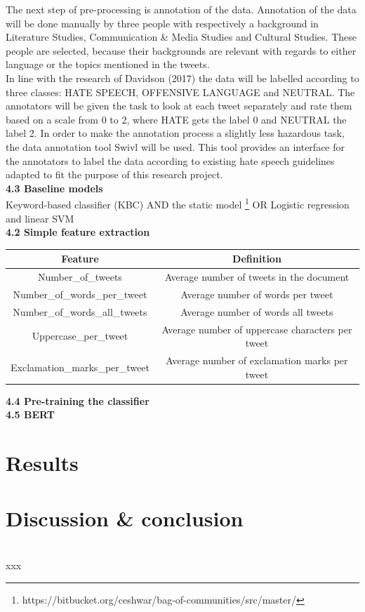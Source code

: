 \documentclass[a4paper,pdf]{article}
\begin{document}
\break{}
The next step of pre-processing is annotation of the data. Annotation of the data will be done manually by three people with respectively a background in Literature Studies, Communication \& Media Studies and Cultural Studies. These people are selected, because their backgrounds are relevant with regards to either language or the topics mentioned in the tweets. \\
\break{}
In line with the research of Davidson (2017) the data will be labelled according to three classes: HATE SPEECH, OFFENSIVE LANGUAGE and NEUTRAL. The annotators will be given the task to look at each tweet separately and rate them based on a scale from 0 to 2, where HATE gets the label 0 and NEUTRAL the label 2. In order to make the annotation process a slightly less hazardous task, the data annotation tool Swivl will be used. This tool provides an interface for the annotators to label the data according to existing hate speech guidelines adapted to fit the purpose of this research project.\\
\break{}
\textbf{4.3 Baseline models}\\
Keyword-based classifier (KBC) AND the static model \footnote{https://bitbucket.org/ceshwar/bag-of-communities/src/master/}
OR Logistic regression and linear SVM\\
\break{}
\textbf{4.2 Simple feature extraction}

\begin{center}
 \begin{tabular}{||c c||} 
 \hline
 Feature & Definition \\ [0.5ex] 
 \hline\hline
 Number\_of\_tweets & Average number of tweets in the document \\ 
 \hline
 Number\_of\_words\_per\_tweet & Average number of words per tweet\\
 \hline
 Number\_of\_words\_all\_tweets & Average number of words all tweets\\
 \hline
 Uppercase\_per\_tweet & Average number of uppercase characters per tweet\\
 \hline
Exclamation\_marks\_per\_tweet & Average number of exclamation marks per tweet\\ [1ex] 
 \hline
\end{tabular}
\end{center}

\textbf{4.4 Pre-training the classifier}\\
\break{}
\textbf{4.5 BERT}\\
\break{}
\section{Results}
\section{Discussion \& conclusion}\\
xxx
\maketitle



\medskip


\end{document}
